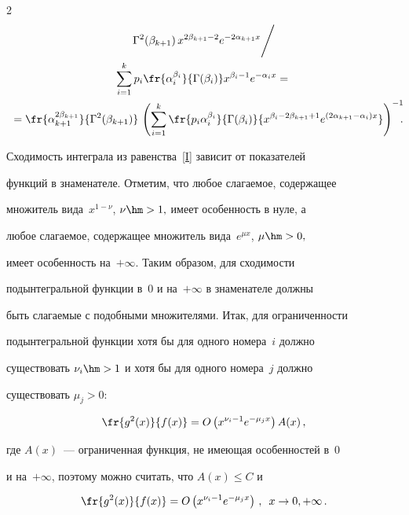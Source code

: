 \begin{multicols}{2}
\begin{multline*}
{\Gamma^2(\beta_{k+1})}\,x^{2\beta_{k+1}-2}e^{-2\alpha_{k+1}x}\Bigg/\\

{\sum\limits_{i=1}^{k}p_i \fr{\alpha_i^{\beta_i}}

{\Gamma(\beta_i)}x^{\beta_i-1}e^{-\alpha_ix}}={}\\

\!{}=\fr{\alpha_{k+1}^{2\beta_{k+1}}}{\Gamma^2(\beta_{k+1})}\,

\left({\sum\limits_{i=1}^{k}\fr{p_i\alpha_i^{\beta_i}}{\Gamma(\beta_i)}

{x^{\beta_i-2\beta_{k+1}+1}

e^{\left(2\alpha_{k+1}-\alpha_i\right)x}}}\right)^{-1}\!\!\!.\hspace*{-7.35753pt}

\end{multline*}

Сходимость интеграла из равенства~\eqref{I} зависит от показателей

функций в знаменателе. Отметим, что любое слагаемое, содержащее

множитель вида~$x^{1-\nu}$, $\nu\hm>1,$ имеет особенность в нуле, а

любое слагаемое, содержащее множитель вида~$e^{\mu x}$, $\mu\hm>0,$

имеет особенность на~$+\infty$. Таким образом, для сходимости

подынтегральной функции в~$0$ и на~$+\infty$ в знаменателе должны

быть слагаемые с подобными множителями. Итак, для ограниченности

подынтегральной функции хотя бы для одного номера~$i$ должно

существовать $\nu_i\hm>1$ и хотя бы для одного номера~$j$ должно

существовать $\mu_j>0$:

\begin{equation*}

\fr{g^2(x)}{f(x)}=O\left(x^{\nu_i-1}e^{-\mu_j x}\right) A(x)\,,

\end{equation*}

где $A(x)$~--- ограниченная функция, не имеющая особенностей в~0 

и на~$+\infty$, поэтому можно считать, что $A(x)\leqslant C$ и

\begin{equation*}

\fr{g^2(x)}{f(x)}=O\left(x^{\nu_i-1}e^{-\mu_j x}\right)\,,\enskip x\to0,+\infty\,.


\end{equation*}
\end{multicols}
